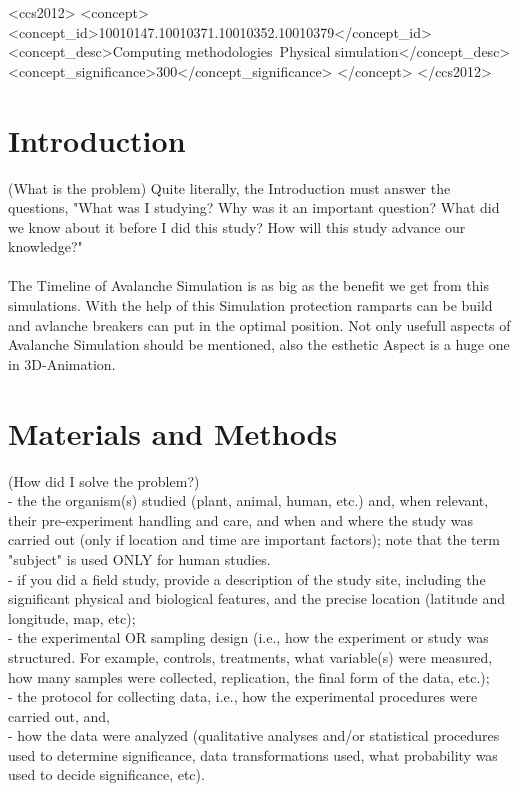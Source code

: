 \documentclass{sig-alternate-05-2015}
\begin{document}
\begin{CCSXML}
<ccs2012>
<concept>
<concept_id>10010147.10010371.10010352.10010379</concept_id>
<concept_desc>Computing methodologies~Physical simulation</concept_desc>
<concept_significance>300</concept_significance>
</concept>
</ccs2012>
\end{CCSXML}





\section{Introduction}
(What is the problem)
Quite literally, the Introduction must answer the questions, "What was I studying? Why was it an important question? What did we know about it before I did this study? How will this study advance our knowledge?"
\\
\\
The Timeline of Avalanche Simulation is as big as the benefit we get from this simulations. With the help of this Simulation protection ramparts can be build and avlanche breakers can put in the optimal position. Not only usefull aspects of Avalanche Simulation should be mentioned, also the esthetic Aspect is a huge one in 3D-Animation. 

\section {Materials and Methods}
(How did I solve the problem?)\\
- the the organism(s) studied (plant, animal, human, etc.) and, when relevant, their pre-experiment handling and care, and when and where the study was carried out (only if location and time are important factors); note that the term "subject" is used ONLY for human studies.\\
- if you did a field study, provide a description of the study site, including the significant physical and biological features, and the precise location (latitude and longitude, map, etc);\\
- the experimental OR sampling design (i.e., how the experiment or study was structured. For example, controls, treatments, what variable(s) were measured, how many samples were collected, replication, the final form of the data, etc.);\\
- the protocol for collecting data, i.e., how the experimental procedures were carried out, and,\\
- how the data were analyzed (qualitative analyses and/or statistical procedures used to determine significance, data transformations used, what probability was used to decide significance, etc).\\
\\
\end{document}
